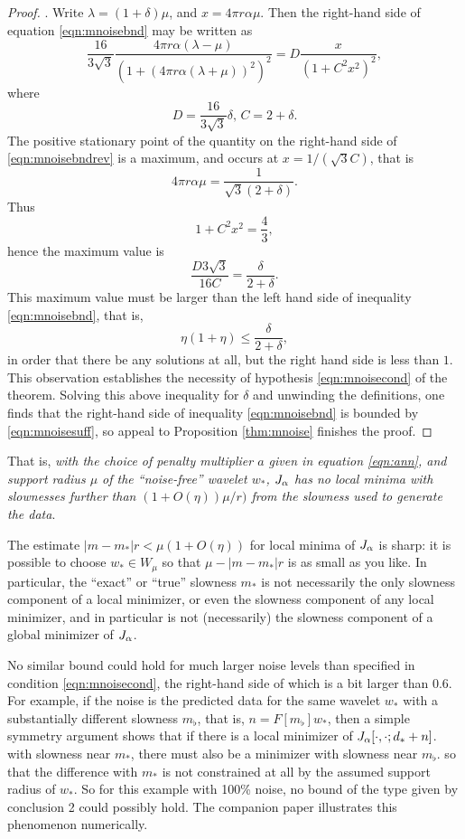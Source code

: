 \begin{proof}.
  Write $\lambda = (1+\delta)\mu$, and $x=4 \pi r \alpha \mu$. Then
  the right-hand side of equation \ref{eqn:mnoisebnd} may be written as
  \begin{equation}
    \label{eqn:mnoisebndrev}
    \frac{16}{3\sqrt{3}}\frac{4\pi r \alpha
      (\lambda-\mu)}{(1+(4\pi r\alpha(\lambda+\mu))^2)^2} = D
    \frac{x}{(1+C^2 x^2)^2},
  \end{equation}
  where
  \[
    D=\frac{16}{3\sqrt{3}}\delta,\,C=2+\delta.
  \]
  The positive stationary point of the quantity on the right-hand side
  of \ref{eqn:mnoisebndrev} is a maximum, and occurs at
  $x=1/(\sqrt{3}C)$, that is
  \[
    4 \pi r \alpha \mu = \frac{1}{\sqrt{3}(2+\delta)}.
  \]
  Thus
  \[
    1+C^2x^2 = \frac{4}{3},
  \]
  hence the maximum value is
  \[
    \frac{D3\sqrt{3}}{16C} = \frac{\delta}{2+\delta}.
  \]
  This maximum value must be larger than the left hand side of inequality
  \ref{eqn:mnoisebnd}, that is,
  \[
    \eta(1+\eta) \le \frac{\delta}{2+\delta},
  \]
  in order that there be any solutions at all, but the right hand side
  is less than $1$. This observation establishes the necessity of
  hypothesis \ref{eqn:mnoisecond} of the
  theorem. Solving this above inequality for $\delta$ and unwinding
  the definitions, one finds that the right-hand side of inequality
  \ref{eqn:mnoisebnd} is bounded by \ref{eqn:mnoisesuff}, so appeal to
  Proposition \ref{thm:mnoise} finishes the proof.
\end{proof}

 That is, {\em with the choice of penalty
  multiplier $a$ given in equation \ref{eqn:ann}, and support radius
  $\mu$ of the ``noise-free'' wavelet $w_*$, $J_{\alpha}$ has no local
  minima with slownesses further than $(1+O(\eta))\mu/r)$ from the slowness used to
  generate the data}.

 The estimate $|m-m_*|r<\mu(1+O(\eta))$ for
local minima of $J_{\alpha}$ is sharp: it is possible to choose $w_* \in W_{\mu}$
so that $\mu - |m-m_*|r$ is as small as you like. In particular,
the ``exact'' or ``true'' slowness $m_*$ is not necessarily the only
slowness component of a local minimizer, or even the slowness
component of any local minimizer, and in particular
is not (necessarily) the slowness component of a global minimizer of $J_{\alpha}$.

 No similar bound could hold for much larger
noise levels than specified in condition \ref{eqn:mnoisecond}, the
right-hand side of which is a bit larger than 0.6. For example, if the noise is
the predicted data for the same wavelet $w_*$ with a substantially different
slowness $m_{\flat}$, that is, $n=F[m_{\flat}]w_*$, then a simple
symmetry argument shows that if there is a local minimizer of $J_{\alpha}[\cdot,\cdot;d_*+n]$. with
slowness near $m_*$,
there must also be a minimizer with slowness near $m_{\flat}$.
so that the difference with $m_*$ is not constrained at
all by the assumed support radius of $w_*$. So for this example with 100\% noise, no
bound of the type given by conclusion 2 could possibly hold. The
companion paper \cite[]{SymesChenMinkoff:21}
illustrates this phenomenon numerically.

